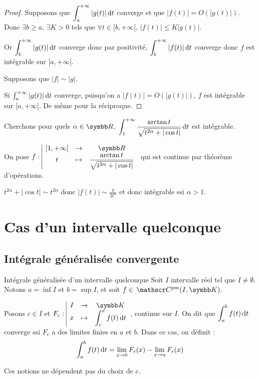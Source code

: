 \begin{proof}
    Supposons que $\displaystyle \int_{a }^{+ \infty } |g(t)| \,\mathrm{d}t$ converge et que 
    $|f(t)| = O(|g(t)|)$. Donc $\exists b \geqslant a, \, \exists K > 0$ tels que 
    $\forall t \in [b, + \infty[, \, |f(t)| \leqslant K |g(t)|$.

    Or $\displaystyle \int_{b }^{+ \infty   } |g(t)| \,\mathrm{d}t$ converge donc par positivité,
    $\displaystyle \int_{b }^{+ \infty   } |f(t)| \,\mathrm{d}t$ converge donc $f$ est intégrable sur $[a, + \infty[$.


    \lvspace Supposons que $|f| \sim |g|$. 

    Si $\int_{a }^{+ \infty   } |g(t)| \,\mathrm{d}t$ converge, puisqu'on a $|f(t)| = O(|g(t)|)$,
    $f$ est intégrable sur $[a, + \infty[$. De même pour la réciproque.
\end{proof}

\begin{exemple}
    Cherchons pour quels $\alpha \in \R$, $\displaystyle \int_1^{+ \infty} \frac{\arctan t}{\sqrt{t^{2 \alpha} + |\cos t|}} \,\mathrm{d}t$ est intégrable.


    On pose $\fonction f {[1, + \infty[}{\R}{t}{\frac{\arctan t}{\sqrt{t^{2 \alpha} + |\cos t|}}}$ qui est continue par théorème d'opérations.

    $t^{2 \alpha} + | \cos t | \sim t^{2 \alpha}$ donc $|f(t)| \sim \frac{\pi}{2 t^\alpha}$ et donc 
    intégrable ssi $\alpha > 1$.
\end{exemple}

\section{Cas d'un intervalle quelconque }
\subsection{Intégrale généralisée convergente }

\begin{definition}{Intégrale généralisée d'un intervalle quelconque}{}
    Soit $I$ intervalle réel tel que $\mathring I \neq \emptyset$. 
    Notons $a = \inf I$ et $b = \sup I$, et soit ${f \in \mc{pm}(I, \K)}$.

    Posons $c \in I$ et $\fonction{F_c}{I}{\K}{x}{\int_c^x f(t) \dt}$, continue sur $I$. 
    On dit que $\displaystyle \int_{a }^{b } f(t) \,\mathrm{d}t$ converge ssi $F_c$ a des limites finies 
    en $a$ et $b$. Dans ce cas, on définit : 
    $$\int_a^b f(t) \,\mathrm{d}t = \lim_{x \to b} F_c(x) - \lim_{x \to a} F_c(x)$$

    Ces notions ne dépendent pas du choix de $c$.
\end{definition}

